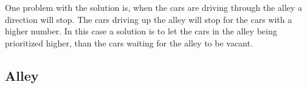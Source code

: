 One problem with the solution is, when the cars are driving through the alley a direction will stop. The cars driving up the alley will stop for the cars with a higher number. In this case a solution is to let the cars in the alley being prioritized higher, than the cars waiting for the alley to be vacant.

\subsection{Alley}